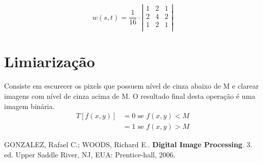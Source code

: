 \documentclass[10pt,a4paper]{article}
\begin{document}
\[ w(s,t) = \frac{1}{16} \cdot \left|
\begin{array}{ccc}
1 & 2 & 1 \\
2 & 4 & 2 \\
1 & 2 & 1 \\
\end{array}\right|\]

\section{Limiarização}
Consiste em escurecer os pixels que possuem nível de cinza abaixo de M e clarear imagens com nível de cinza acima de M. O resultado final desta operação é uma imagem binária.
\begin{align*}
    T[f(x,y)] &= 0 \text{ se } f(x,y) < M \\
              &= 1 \text{ se } f(x,y) > M
\end{align*}

\begin{thebibliography}{99}
     GONZALEZ, Rafael C.; WOODS, Richard E.. \textbf{Digital Image Processing}. 3. ed. Upper Saddle River, NJ, EUA: Prentice-hall, 2006.
\end{thebibliography}
\end{document}

